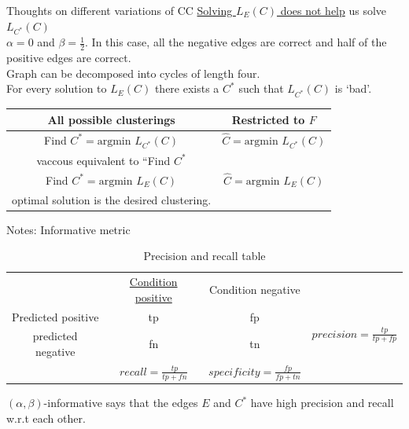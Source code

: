 \documentclass{beamer}
\begin{document}
\begin{frame}[label=CCThoughts]{Thoughts on different variations of CC}
	\hyperlink{CCFramework}{Solving $L_E(C)$ does not help} us solve $L_{C^*}(C)$\\
	$\alpha = 0$ and $\beta = \frac{1}{2}$. In this case, all the negative edges are correct and half of the positive edges are correct.\\
	Graph can be decomposed into cycles of length four.\\
	For every solution to $L_E(C)$ there exists a $C^*$ such that $L_{C^*}(C)$ is `bad'. 
\begin{table}[!ht]
\centering
\def\arraystretch{1.5}
\begin{tabular}{c|c}
	All possible clusterings & Restricted to $F$\\
	\hline
	Find $C^* = \text{argmin } L_{C^*}(C)$ & $\hat C = \text{argmin } L_{C^*}(C)$ \\
	vaccous equivalent to ``Find $C^*$ & \\
	\hline 
	Find $C^* = \text{argmin } L_{E}(C)$ & $\hat C = \text{argmin } L_{E}(C)$\\
	optimal solution is the desired clustering.\\
	\hline
\end{tabular}
\end{table}
\end{frame}

\begin{frame}[label=notesInformativeMetric]{Notes: Informative metric}
	\begin{table}[!ht]
\centering
\def\arraystretch{1.5}
\begin{tabular}{c|c|c|c}
	& \multirow{2}{2cm}{\hyperlink{informativeMetric}{Condition positive}} & \multirow{ 2}{1cm}{Condition negative}&\\
	&&&\\
	Predicted positive &tp &fp & \multirow{2}{3cm}{$precision = \frac{tp}{tp+fp}$}\\
	predicted negative &fn & tn\\
	\hline
	& $recall = \frac{tp}{tp+fn}$& $specificity = \frac{fp}{fp+tn}$ &
\end{tabular}
\caption{Precision and recall table}
\end{table}
\noindent $(\alpha, \beta)$-informative says that the edges $E$ and $C^*$ have high precision and recall w.r.t each other.  
\end{frame}
\end{document}
